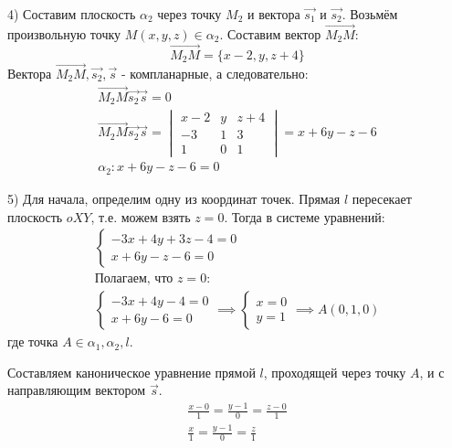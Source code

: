 \begin{eg}
  4) Составим плоскость $\alpha_2$ через точку $M_2$  и вектора $\vec{s_1}$ и $\vec{s_2}$.
  Возьмём произвольную точку $M(x, y, z) \in \alpha_2$.
  Составим вектор $\overrightarrow{M_2M}$: \[
  \overrightarrow{M_2M} = \{x - 2, y, z + 4\} 
  \] 
  Вектора $\overrightarrow{M_2M}, \vec{s_2}, \vec{s}$ - компланарные, а следовательно: 
  \begin{gather*}
    \overrightarrow{M_2M} \vec{s_2} \vec{s} = 0 \\
    \vec{M_2M} \vec{s_2} \vec{s} = 
    \begin{vmatrix}
      x - 2 & y & z + 4 \\
      -3 & 1 & 3 \\
      1 & 0 & 1
    \end{vmatrix} = 
    x + 6y - z - 6 \\
    \boxed{\alpha_2: x + 6y - z - 6 = 0}
  \end{gather*}

  5) Для начала, определим одну из координат точек. Прямая $l$ пересекает плоскость $oXY$, т.е. можем взять $z = 0$. Тогда в системе уравнений:
   \begin{gather*}
    \begin{cases}
      -3x + 4y + 3z - 4 = 0 \\
      x + 6y - z - 6 = 0
    \end{cases} \\
    \text{Полагаем, что } z = 0: \\
    \begin{cases}
      -3x + 4y - 4 = 0 \\
      x + 6y - 6 = 0
    \end{cases} \implies \begin{cases}
      x = 0 \\
      y = 1 
    \end{cases} \implies A(0, 1, 0)
  \end{gather*}
  где точка $A \in \alpha_1, \alpha_2, l$.
  
  Составляем каноническое уравнение прямой $l$, проходящей через точку $A$, и с направляющим вектором $\vec{s}$.
  \begin{gather*}
    \frac{x - 0}{1} = \frac{y - 1}{0} = \frac{z - 0}{1} \\
    \boxed{\frac{x}{1} = \frac{y - 1}{0} = \frac{z}{1}}
  \end{gather*}
\end{eg}

